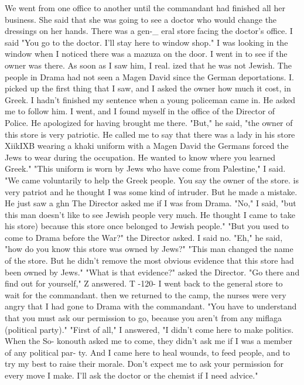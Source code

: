 We went from one office to 
another until the commandant had finished all her business.
She said that she was 
going to see a doctor who would change the dressings on her hands.
There was a gen-_ 
eral store facing the doctor's office.
I said "You go to the doctor.
I'll stay 
here to window shop."
I was looking in the window when I noticed there was a mazuza 
on the door.
I went in to see if the owner was there.
As soon as I saw him, I real.
ized that he was not Jewish.
The people in Drama had not seen a Magen David since the German deportations.
I. picked up the first thing that I saw, and I asked the owner how much it cost, in 
Greek.
I hadn't finished my sentence when a young policeman came in.
He asked me 
to follow him.
I went, and I found myself in the office of the Director of Police.
He apologized for having brought me there.
"But," he said, "the owner of this store is very patriotic.
He called me to say 
that there was a lady in his store XiikIXB wearing a khaki uniform with a Magen David 
the Germans forced the Jews to wear during the occupation.
He wanted to know where 
you learned Greek."
"This uniform is worn by Jews who have come from Palestine," I said.
"We came 
voluntarily to help the Greek people.
You say the owner of the store.
is very patriot 
and he thought I was some kind of intruder.
But he made a mistake.
He just saw a ghn 
The Director asked me if I was from Drama.
"No," I said, "but this man doesn't 
like to see Jewish people very much.
He thought I came to take his store) because 
this store once belonged to Jewish people."
"But you used to come to Drama before the War?"
the Director asked.
I said no.
"Eh," he said, "how do you know this store was owned by Jews?"
"This man changed the name of the store.
But he didn't remove the most obvious 
evidence that this store had been owned by Jews."
"What is that evidence?"
asked the Director.
"Go there and find out for yourself," Z answered.
T 
-120- 
I went back to the general store to wait for the commandant.
then we returned to the camp, the nurses were very angry that I had gone to 
Drama with the commandant.
"You have to understand that you must ask our permission 
to go, because you aren't from any miflaga (political party)."
"First of all," I answered, "I didn't come here to make politics.
When the So-
konouth asked me to come, they didn't ask me if I was a member of any political par-
ty.
And I came here to heal wounds, to feed people, and to try my best to raise 
their morale.
Don't expect me to ask your permission for every move I make.
I'll 
ask the doctor or the chemist if I need advice."
